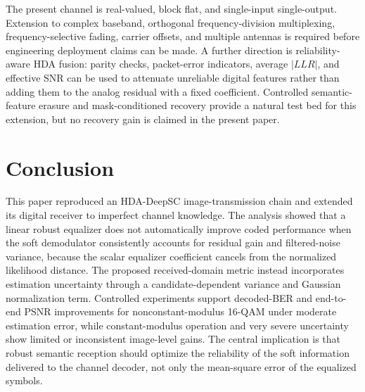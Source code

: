 \documentclass[conference]{IEEEtran}
\newcommand{\BER}{BER}
\newcommand{\PSNR}{PSNR}
\newcommand{\LLR}{LLR}
\begin{document}
The present channel is real-valued, block flat, and single-input single-output. Extension to complex baseband, orthogonal frequency-division multiplexing, frequency-selective fading, carrier offsets, and multiple antennas is required before engineering deployment claims can be made. A further direction is reliability-aware HDA fusion: parity checks, packet-error indicators, average $|\LLR|$, and effective SNR can be used to attenuate unreliable digital features rather than adding them to the analog residual with a fixed coefficient. Controlled semantic-feature erasure and mask-conditioned recovery provide a natural test bed for this extension, but no recovery gain is claimed in the present paper.

\section{Conclusion}
This paper reproduced an HDA-DeepSC image-transmission chain and extended its digital receiver to imperfect channel knowledge. The analysis showed that a linear robust equalizer does not automatically improve coded performance when the soft demodulator consistently accounts for residual gain and filtered-noise variance, because the scalar equalizer coefficient cancels from the normalized likelihood distance. The proposed received-domain metric instead incorporates estimation uncertainty through a candidate-dependent variance and Gaussian normalization term. Controlled experiments support decoded-\BER{} and end-to-end \PSNR{} improvements for nonconstant-modulus 16-QAM under moderate estimation error, while constant-modulus operation and very severe uncertainty show limited or inconsistent image-level gains. The central implication is that robust semantic reception should optimize the reliability of the soft information delivered to the channel decoder, not only the mean-square error of the equalized symbols.

\balance


\end{document}
